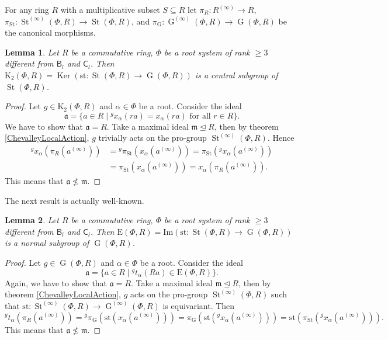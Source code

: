 \documentclass{article}
\numberwithin{equation}{section}
\newtheorem{lemma}{Lemma} \numberwithin{lemma}{section}
\theoremstyle{definition}
\theoremstyle{remark}
\DeclareMathOperator\St{St}
\DeclareMathOperator\Ker{Ker}
\DeclareMathOperator\GG{G}
\newcommand{\up}[2]{{^{#1}\!{#2}}}
\newcommand{\rB}{\mathsf{B}}
\newcommand{\rC}{\mathsf{C}}
\begin{document}
For any ring \(R\) with a multiplicative subset \(S \subseteq R\) let \(\pi_R \colon R^{(\infty)} \to R\), \(\pi_{\St} \colon \St^{(\infty)}(\Phi, R) \to \St(\Phi, R)\), and \(\pi_{\GG} \colon \GG^{(\infty)}(\Phi, R) \to \GG(\Phi, R)\) be the canonical morphisms.

\begin{lemma}\label{CentralityK2}
 Let \(R\) be a commutative ring, \(\Phi\) be a root system of rank \(\geq 3\) different from \(\rB_l\) and \(\rC_l\). Then \(\mathrm K_2(\Phi, R) = \Ker(\mathrm{st} \colon \St(\Phi, R) \to \GG(\Phi, R))\) is a central subgroup of \(\St(\Phi, R)\).
\end{lemma}
\begin{proof}
 Let \(g \in \mathrm K_2(\Phi, R)\) and \(\alpha \in \Phi\) be a root. Consider the ideal
 \[\mathfrak a = \{a \in R \mid \up g{x_\alpha(ra)} = x_\alpha(ra) \text{ for all } r \in R\}.\]
 We have to show that \(\mathfrak a = R\). Take a maximal ideal \(\mathfrak m \trianglelefteq R\), then by theorem \ref{ChevalleyLocalAction}, \(g\) trivially acts on the pro-group \(\St^{(\infty)}(\Phi, R)\). Hence
 \begin{align*}
  \up g{x_\alpha(\pi_R(a^{(\infty)}))}
  &= \up g{\pi_{\St}(x_\alpha(a^{(\infty)}))}
  = \pi_{\St}(\up g{x_\alpha(a^{(\infty)})})\\
  &= \pi_{\St}(x_\alpha(a^{(\infty)}))
  = x_\alpha(\pi_R(a^{(\infty)})).
 \end{align*}
 This means that \(\mathfrak a \not \leq \mathfrak m\).
\end{proof}

The next result is actually well-known. %

\begin{lemma}\label{Normality}
 Let \(R\) be a commutative ring, \(\Phi\) be a root system of rank \(\geq 3\) different from \(\rB_l\) and \(\rC_l\). Then \(\mathrm E(\Phi, R) = \mathrm{Im}(\mathrm{st} \colon \St(\Phi, R) \to \GG(\Phi, R))\) is a normal subgroup of \(\GG(\Phi, R)\).
\end{lemma}
\begin{proof}
 Let \(g \in \GG(\Phi, R)\) and \(\alpha \in \Phi\) be a root. Consider the ideal
 \[\mathfrak a = \{a \in R \mid \up g{t_\alpha(Ra)} \in \mathrm E(\Phi, R)\}.\]
 Again, we have to show that \(\mathfrak a = R\). Take a maximal ideal \(\mathfrak m \trianglelefteq R\), then by theorem \ref{ChevalleyLocalAction}, \(g\) acts on the pro-group \(\St^{(\infty)}(\Phi, R)\) such that \(\mathrm{st} \colon \St^{(\infty)}(\Phi, R) \to \GG^{(\infty)}(\Phi, R)\) is equivariant. Then
 \[
  \up g{t_\alpha(\pi_R(a^{(\infty)}))}
  = \up g{\pi_{\GG}(\mathrm{st}(x_\alpha(a^{(\infty)})))}
  = \pi_{\GG}(\mathrm{st}(\up g{x_\alpha(a^{(\infty)})}))
  = \mathrm{st}(\pi_{\St}(\up g{x_\alpha(a^{(\infty)})})).
 \]
 This means that \(\mathfrak a \not \leq \mathfrak m\).
\end{proof}
\end{document}
